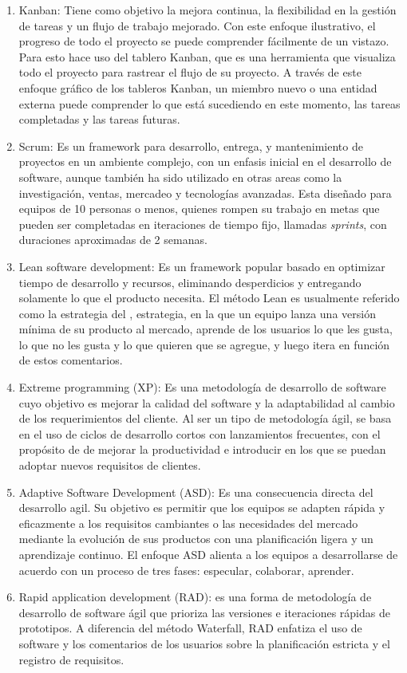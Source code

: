     \begin{enumerate}
        \item Kanban: Tiene como objetivo la mejora continua, la flexibilidad en la gestión de tareas y un flujo de trabajo mejorado. Con este enfoque ilustrativo, el progreso de todo el proyecto se puede comprender fácilmente de un vistazo. Para esto hace uso del tablero Kanban, que es una herramienta que visualiza todo el proyecto para rastrear el flujo de su proyecto. A través de este enfoque gráfico de los tableros Kanban, un miembro nuevo o una entidad externa puede comprender lo que está sucediendo en este momento, las tareas completadas y las tareas futuras.
        \item Scrum: Es un framework para desarrollo, entrega, y mantenimiento de proyectos en un ambiente complejo, con un enfasis inicial en el desarrollo de software, aunque también ha sido utilizado en otras areas como la investigación, ventas, mercadeo y tecnologías avanzadas. Esta diseñado para equipos de 10 personas o menos, quienes rompen su trabajo en metas que pueden ser completadas en iteraciones de tiempo fijo, llamadas \emph{sprints}, con duraciones aproximadas de 2 semanas. 
        \item Lean software development: Es un framework popular basado en optimizar tiempo de desarrollo y recursos, eliminando desperdicios y entregando solamente lo que el producto necesita. El método Lean es usualmente referido como la estrategia del , 
        estrategia, en la que un equipo lanza una versión mínima de su producto al mercado, aprende de los usuarios lo que les gusta, lo que no les gusta y lo que quieren que se agregue, y luego itera en función de estos comentarios.
        \item Extreme programming (XP): Es una metodología de desarrollo de software cuyo objetivo es mejorar la calidad del software y la adaptabilidad al cambio de los requerimientos del cliente. Al ser un tipo de metodología ágil, se basa en el uso de ciclos de desarrollo cortos con lanzamientos frecuentes, con el propósito de de mejorar la productividad e introducir  en los que se puedan adoptar nuevos requisitos de clientes.
        \item Adaptive Software Development (ASD): Es una consecuencia directa del desarrollo agil. Su objetivo es permitir que los equipos se adapten rápida y eficazmente a los requisitos cambiantes o las necesidades del mercado mediante la evolución de sus productos con una planificación ligera y un aprendizaje continuo. El enfoque ASD alienta a los equipos a desarrollarse de acuerdo con un proceso de tres fases: especular, colaborar, aprender. 
        \item Rapid application development (RAD):  es una forma de metodología de desarrollo de software ágil que prioriza las versiones e iteraciones rápidas de prototipos. A diferencia del método Waterfall, RAD enfatiza el uso de software y los comentarios de los usuarios sobre la planificación estricta y el registro de requisitos.
    \end{enumerate}
